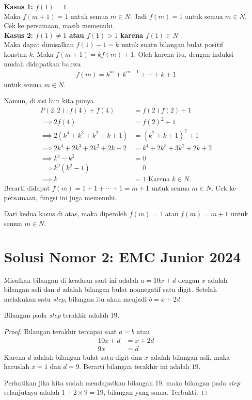 \documentclass[a4paper, 12pt]{scrartcl}
\begin{document}
\textbf{Kasus 1: $f(1)=1$}\\
Maka $f(m+1)=1$ untuk semua $m\in N$. Jadi $f(m)=1$ untuk semua $m\in N$. Cek ke persamaan, masih memenuhi.\\


\textbf{Kasus 2: $f(1)\neq 1$ atau $f(1)>1$ karena $f(1)\in N$}\\
Maka dapat dimisalkan $f(1)-1=k$ untuk suatu bilangan bulat positif konstan $k$. Maka $f(m+1)=kf(m)+1$. 
Oleh karena itu, dengan induksi mudah didapatkan bahwa 
\begin{align*}
    f(m)=k^{m}+k^{m-1}+\cdots+k+1
\end{align*}
untuk semua $m\in N$.

Namun, di sisi lain kita punya
\begin{align*}
    P(2,2): f(4)+f(4)&=f(2)f(2)+1 \\
    \implies 2f(4)&=f(2)^2+1\\
    \implies 2(k^4+k^3+k^2+k+1)&=(k^2+k+1)^2+1\\
    \implies 2k^4+2k^3+2k^2+2k+2&=k^4+2k^3+3k^2+2k+2\\
    \implies k^4-k^2&=0\\
    \implies k^2(k^2-1)&=0\\
    \implies k&=1 \text{ Karena $k\in N$}.
\end{align*}
Berarti didapat $f(m)=1+1+\cdots+1= m+1$ untuk semua $m\in N$. Cek ke persamaan, fungsi ini juga memenuhi.

Dari kedua kasus di atas, maka diperoleh $f(m)=1$ atau $f(m)=m+1$ untuk semua $m\in N$.


\section{Solusi Nomor 2: EMC Junior 2024}

    Misalkan bilangan di keadaan saat ini adalah $a=10x+d$ dengan $x$ adalah bilangan asli dan $d$ adalah bilangan bulat nonnegatif satu digit. Setelah melakukan satu \textit{step}, bilangan itu akan menjadi $b=x+2d$.

    \begin{lemma*}
        Bilangan pada \textit{step} terakhir adalah 19.
        \begin{proof}
            Bilangan terakhir tercapai saat $a=b$ atau
            \begin{align*}
                10x+d &= x+2d\\
                9x &= d
            \end{align*}
            Karena $d$ adalah bilangan bulat satu digit dan $x$ adalah bilangan asli, maka haruslah $x=1$ dan $d=9$. Berarti bilangan terakhir ini adalah $19$.
            
            Perhatikan jika kita sudah mendapatkan bilangan 19, maka bilangan pada \textit{step} selanjutnya adalah $1+2\times 9 = 19$, bilangan yang sama. Terbukti.
        \end{proof}
    \end{lemma*}
\end{document}
